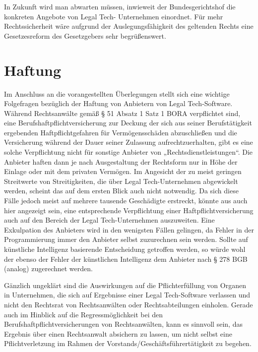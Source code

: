In Zukunft wird man abwarten müssen, inwieweit der Bundesgerichtshof die konkreten Angebote von Legal Tech- Unternehmen einordnet. Für mehr Rechtssicherheit wäre aufgrund der Auslegungsfähigkeit des geltenden Rechts eine Gesetzesreform des Gesetzgebers sehr begrüßenswert.

\section{Haftung}

Im Anschluss an die vorangestellten Überlegungen stellt sich eine wichtige Folgefragen bezüglich der Haftung von Anbietern von Legal Tech-Software. Während Rechtsanwälte gemäß § 51 Absatz 1 Satz 1 BORA verpflichtet sind, eine Berufshaftpflichtversicherung zur Deckung der sich aus seiner Berufstätigkeit ergebenden Haftpflichtgefahren für Vermögensschäden abzuschließen und die Versicherung während der Dauer seiner Zulassung aufrechtzuerhalten, gibt es eine solche Verpflichtung nicht für sonstige Anbieter von „Rechtsdienstleistungen“. Die Anbieter haften dann je nach Ausgestaltung der Rechtsform nur in Höhe der Einlage oder mit dem privaten Vermögen. Im Angesicht der zu meist geringen Streitwerte von Streitigkeiten, die über Legal Tech-Unternehmen abgewickelt werden, scheint das auf dem ersten Blick auch nicht notwendig. Da sich diese Fälle jedoch meist auf mehrere tausende Geschädigte erstreckt, könnte aus auch hier angezeigt sein, eine entsprechende Verpflichtung einer Haftpflichtversicherung auch auf den Bereich der Legal Tech-Unternehmen auszuweiten. Eine Exkulpation des Anbieters wird in den wenigsten Fällen gelingen, da Fehler in der Programmierung immer den Anbieter selbst zuzurechnen sein werden. Sollte auf künstliche Intelligenz basierende Entscheidung getroffen werden, so würde wohl der ebenso der Fehler der künstlichen Intelligenz dem Anbieter nach § 278 BGB (analog) zugerechnet werden.

Gänzlich ungeklärt sind die Auswirkungen auf die Pflichterfüllung von Organen in Unternehmen, die sich auf Ergebnisse einer Legal Tech-Software verlassen und nicht den Rechtsrat von Rechtsanwälten oder Rechtsabteilungen einholen. Gerade auch im Hinblick auf die Regressmöglichkeit bei den Berufshaftpflichtversicherungen von Rechtsanwälten, kann es sinnvoll sein, das Ergebnis über einen Rechtsanwalt absichern zu lassen, um nicht selbst eine Pflichtverletzung im Rahmen der Vorstands/Geschäftsführertätigkeit zu begehen.